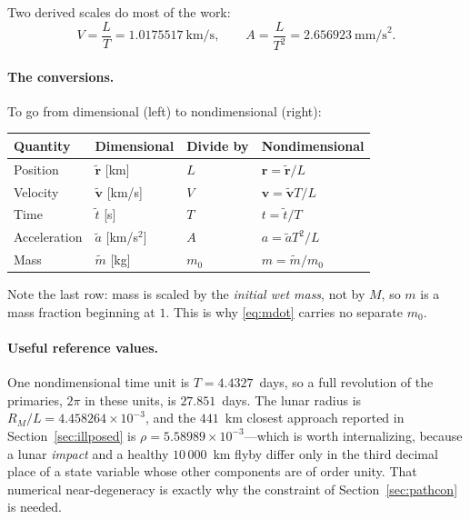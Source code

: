 \documentclass[11pt]{article}
\newcommand{\vecr}{\mathbf{r}}
\newcommand{\vecv}{\mathbf{v}}
\begin{document}
Two derived scales do most of the work:
\[
  V = \frac{L}{T} = 1.0175517~\text{km/s},
  \qquad
  A = \frac{L}{T^2} = 2.656923~\text{mm/s}^2 .
\]

\paragraph{The conversions.} To go from dimensional (left) to nondimensional
(right):

\begin{center}
\begin{tabular}{llll}
\toprule
Quantity & Dimensional & Divide by & Nondimensional \\
\midrule
Position       & $\tilde{\vecr}$ [km]      & $L$     & $\vecr = \tilde{\vecr}/L$ \\
Velocity       & $\tilde{\vecv}$ [km/s]    & $V$     & $\vecv = \tilde{\vecv}T/L$ \\
Time           & $\tilde{t}$ [s]           & $T$     & $t = \tilde{t}/T$ \\
Acceleration   & $\tilde{a}$ [km/s$^2$]    & $A$     & $a = \tilde{a}T^2/L$ \\
Mass           & $\tilde{m}$ [kg]          & $m_0$   & $m = \tilde{m}/m_0$ \\
\bottomrule
\end{tabular}
\end{center}

Note the last row: mass is scaled by the \emph{initial wet mass}, not by $M$, so
$m$ is a mass fraction beginning at $1$. This is why \eqref{eq:mdot} carries no
separate $m_0$.

\paragraph{Useful reference values.} One nondimensional time unit is
$T = 4.4327$~days, so a full revolution of the primaries, $2\pi$ in these
units, is $27.851$~days. The lunar radius is
$R_M/L = 4.458264\times10^{-3}$, and the $441$~km closest approach reported in
Section~\ref{sec:illposed} is $\rho = 5.58989\times10^{-3}$---which is worth
internalizing, because a lunar \emph{impact} and a healthy $10\,000$~km flyby
differ only in the third decimal place of a state variable whose other
components are of order unity. That numerical near-degeneracy is exactly why
the constraint of Section~\ref{sec:pathcon} is needed.
\end{document}
